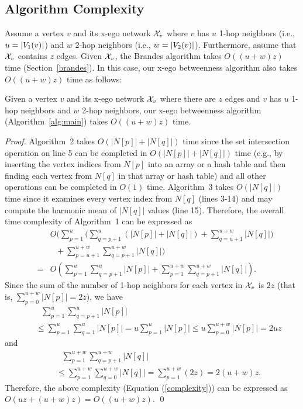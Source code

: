 \subsection{Algorithm Complexity}\label{discussion}

Assume a vertex $v$ and its x-ego network $\XN{v}$ where $v$ has $u$ 1-hop neighbors (i.e., $u = |\V{v}{1}|$) and $w$ 2-hop neighbors (i.e., $w = |\V{v}{2}|$).
Furthermore, assume that $\XN{v}$ contains $z$ edges.
Given $\XN{v}$, the Brandes algorithm takes $O((u + w)z)$ time (Section~\ref{brandes}).
In this case, our x-ego betweenness algorithm also takes $O((u + w)z)$ time as follows:

\begin{theorem}
\label{our_complexity} 
Given a vertex $v$ and its x-ego network $\XN{v}$ where there are $z$ edges and $v$ has $u$ 1-hop neighbors and $w$ 2-hop neighbors, our x-ego betweenness algorithm (Algorithm~\ref{alg:main}) takes $O((u + w)z)$ time.
\begin{proof}
Algorithm~2 takes $O(|N[p]| + |N[q]|)$ time since the set intersection operation on line 5 can be completed in $O(|N[p]| + |N[q]|)$ time (e.g., by inserting the vertex indices from $N[p]$ into an array or a hash table and then finding each vertex from $N[q]$ in that array or hash table) and all other operations can be completed in $O(1)$ time.
Algorithm~3 takes $O(|N[q]|)$ time since it examines every vertex index from $N[q]$ (lines 3-14) and may compute the harmonic mean of $|N[q]|$ values (line 15).
Therefore, the overall time complexity of Algorithm~1 can be expressed as 
\begin{eqnarray}
&&O\Big(\sum_{p=1}^{u} \big(\sum_{q=p+1}^{u} (|N[p]| + |N[q]|) + \sum_{q=u+1}^{u+w} |N[q]|\big)\nonumber \\
&&~~~+ \sum_{p=u+1}^{u+w} \sum_{q=p+1}^{u+w} |N[q]|\Big)\nonumber \\
&=&
O(\sum_{p=1}^{u} \sum_{q=p+1}^{u} |N[p]| + \sum_{p=1}^{u+w} \sum_{q=p+1}^{u+w} |N[q]|).\label{complexity}
\end{eqnarray}
Since the sum of the number of 1-hop neighbors for each vertex in $\XN{v}$ is $2z$ (that is, $\sum_{p=0}^{u+w} |N[p]|=2z$), we have
\begin{eqnarray}
&&~~~\sum_{p=1}^{u} \sum_{q=p+1}^{u} |N[p]| \nonumber \\
&& \le \sum_{p=1}^{u} \sum_{q=1}^{u} |N[p]| = u \sum_{p=1}^{u} |N[p]| \le u \sum_{p=0}^{u+w} |N[p]| = 2uz \nonumber
\end{eqnarray}
and 
\begin{eqnarray}
&&~~~\sum_{p=1}^{u+w} \sum_{q=p+1}^{u+w} |N[q]| \nonumber \\
&&\le \sum_{p=1}^{u+w} \sum_{q=0}^{u+w} |N[q]| = \sum_{p=1}^{u+w} (2z) = 2(u+w)z. \nonumber
\end{eqnarray}
Therefore, the above complexity (Equation (\ref{complexity})) can be expressed as $O(uz + (u+w)z) = O((u+w)z)$. \hfill\qed
\end{proof}
\end{theorem}

